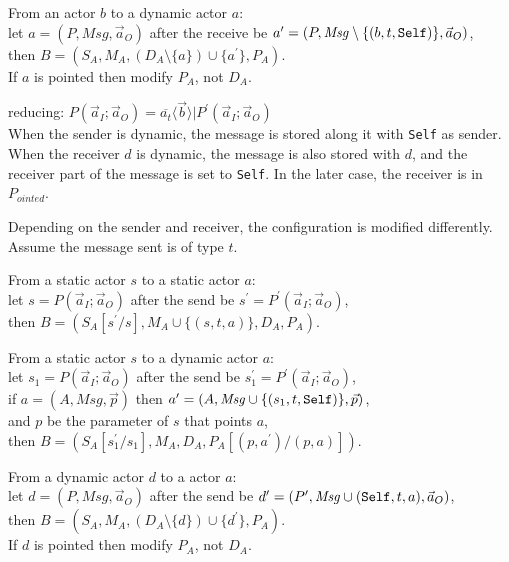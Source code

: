 \documentclass[a4paper]{report}
\numberwithin{algorithm}{chapter}
\begin{document}
\begin{define}
\begin{description}
\begin{description}
\item{From an actor $b$ to a dynamic actor $a$:}\\
let $a = (P,\mathit{Msg},\vec a_O)$ after the receive be $a^\prime = (P,\mathit{Msg} \setminus \{(b, t, \text{\texttt{Self}})\},\vec a_O)$,\\
then $B = (S_A, M_A, (D_A \setminus \{a\}) \cup \{a^\prime\}, P_A)$.\\
If $a$ is pointed then modify $P_A$, not $D_A$.
\end{description}

\item[Send (\ref{dyn_send})] reducing: $P(\vec a_I; \vec a_O) = \overline{a_t}\langle \vec{b} \rangle | P^\prime(\vec a_I ;\vec a_O)$\\
When the sender is dynamic, the message is stored along it with \texttt{Self} as sender.
When the receiver $d$ is dynamic, the message is also stored with $d$, and the receiver part of the message is set to \texttt{Self}.
In the later case, the receiver is in $P_{ointed}$.

Depending on the sender and receiver, the configuration is modified differently.
Assume the message sent is of type $t$.
\begin{description}
\item From a static actor $s$ to a static actor $a$: \\
let $s = P(\vec a_I ;\vec a_O)$ after the send be $s^\prime = P^\prime(\vec a_I ;\vec a_O)$,\\
then $B = (S_A[s^\prime / s], M_A \cup \{(s, t, a)\}, D_A, P_A)$.

\item From a static actor $s$ to a dynamic actor $a$: \\
let $s_1 = P(\vec a_I ;\vec a_O)$ after the send be $s_1^\prime = P^\prime(\vec a_I ;\vec a_O)$,\\
if $a = (A,\mathit{Msg},\vec p)$ then $a^\prime = (A,\mathit{Msg} \cup \{(s_1,t,\text{\texttt{Self}})\},\vec p)$,\\
and $p$ be the parameter of $s$ that points $a$,\\
then $B = (S_A[s_1^\prime / s_1], M_A, D_A, P_A[(p,a^\prime)/(p,a)])$.

\item From a dynamic actor $d$ to a actor $a$: \\
let $d = (P,\mathit{Msg},\vec a_O)$ after the send be $d^\prime = (P^\prime,\mathit{Msg} \cup (\text{\texttt{Self}},t,a),\vec a_O)$,\\
then $B = (S_A, M_A, (D_A \setminus \{d\}) \cup \{d^\prime\}, P_A)$.\\
If $d$ is pointed then modify $P_A$, not $D_A$.


\end{description}
\end{description}
\end{define}
\end{document}

